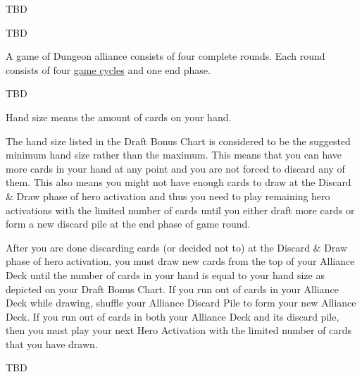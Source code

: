 TBD





TBD

A game of Dungeon alliance consists of four complete rounds. Each round consists of four \hyperref[sec:Gamecycle]{game cycles} and one end phase.


TBD


Hand size means the amount of cards on your hand. 

The hand size listed in the Draft Bonus Chart is considered to be the suggested minimum hand size rather than the maximum. This means that you can have more cards in your hand at any point and you are not forced to discard any of them. This also means you might not have enough cards to draw at the Discard & Draw phase of hero activation and thus you need to play remaining hero activations with the limited number of cards until you either draft more cards or form a new discard pile at the end phase of game round.

After you are done discarding cards (or decided not to) at the Discard & Draw phase of hero activation, you must draw new cards from the top of your Alliance Deck until the number of cards in your hand is equal to your hand size as depicted on your Draft Bonus Chart. If you run out of cards in your Alliance Deck while drawing, shuffle your Alliance Discard Pile to form your new Alliance Deck. If you run out of cards in both your Alliance Deck and its discard pile, then you must play your next Hero Activation with the limited number of cards that you have drawn.




TBD

